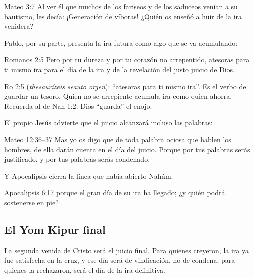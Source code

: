\begin{verso}{Mateo 3:7}
Al ver él que muchos de los fariseos y de los saduceos venían a su bautismo, les decía: ¡Generación de víboras! ¿Quién os enseñó a huir de la ira venidera?
\end{verso}

Pablo, por su parte, presenta la ira futura como algo que se va acumulando:

\begin{verso}{Romanos 2:5}
Pero por tu dureza y por tu corazón no arrepentido, atesoras para ti mismo ira para el día de la ira y de la revelación del justo juicio de Dios.
\end{verso}

\begin{filologiatexto}{Ro 2:5}
 (\emph{thēsaurízeis seautō orgēn}): ``atesoras para ti mismo ira''. Es el verbo de guardar un tesoro. Quien no se arrepiente acumula ira como quien ahorra. Recuerda al  de Nah 1:2: Dios ``guarda'' el enojo.
\end{filologiatexto}

El propio Jesús advierte que el juicio alcanzará incluso las palabras:

\begin{verso}{Mateo 12:36–37}
Mas yo os digo que de toda palabra ociosa que hablen los hombres, de ella darán cuenta en el día del juicio. Porque por tus palabras serás justificado, y por tus palabras serás condenado.
\end{verso}

Y Apocalipsis cierra la línea que había abierto Nahúm:

\begin{verso}{Apocalipsis 6:17}
porque el gran día de su ira ha llegado; ¿y quién podrá sostenerse en pie?
\end{verso}


\subsection{El Yom Kipur final}
La segunda venida de Cristo será el juicio final. Para quienes creyeron, la ira ya fue satisfecha en la cruz, y ese día será de vindicación, no de condena; para quienes la rechazaron, será el día de la ira definitiva.

